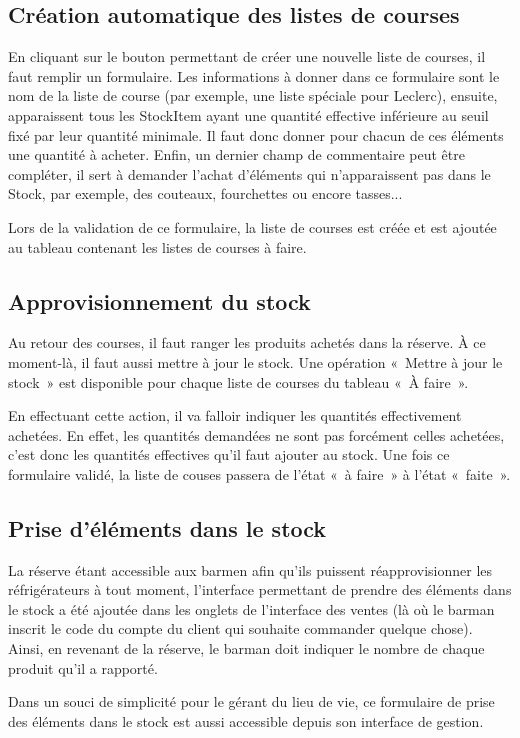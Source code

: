 \documentclass[a4paper]{report}
\begin{document}
\subsection{Création automatique des listes de courses}
\par En cliquant sur le bouton permettant de créer une nouvelle liste de courses, il faut remplir un formulaire. Les
informations à donner dans ce formulaire sont le nom de la liste de course (par exemple, une liste spéciale pour
Leclerc), ensuite, apparaissent tous les StockItem ayant une quantité effective inférieure au seuil fixé par leur
quantité minimale. Il faut donc donner pour chacun de ces éléments une quantité à acheter. Enfin, un dernier champ de
commentaire peut être compléter, il sert à demander l'achat d'éléments qui n'apparaissent pas dans le Stock, par
exemple, des couteaux, fourchettes ou encore tasses...
\par Lors de la validation de ce formulaire, la liste de courses est créée et est ajoutée au tableau contenant les
listes de courses à faire.

\subsection{Approvisionnement du stock}
\par Au retour des courses, il faut ranger les produits achetés dans la réserve. À ce moment-là, il faut aussi mettre à
jour le stock. Une opération « Mettre à jour le stock » est disponible pour chaque liste de courses du tableau « À
faire ».
\par En effectuant cette action, il va falloir indiquer les quantités effectivement achetées. En effet, les quantités
demandées ne sont pas forcément celles achetées, c'est donc les quantités effectives qu'il faut ajouter au stock. Une
fois ce formulaire validé, la liste de couses passera de l'état « à faire » à l'état « faite ».

\subsection{Prise d'éléments dans le stock}
\par La réserve étant accessible aux barmen afin qu'ils puissent réapprovisionner les réfrigérateurs à tout moment,
l'interface permettant de prendre des éléments dans le stock a été ajoutée dans les onglets de l'interface des ventes
(là où le barman inscrit le code du compte du client qui souhaite commander quelque chose). Ainsi, en revenant de la
réserve, le barman doit indiquer le nombre de chaque produit qu'il a rapporté.
\par Dans un souci de simplicité pour le gérant du lieu de vie, ce formulaire de prise des éléments dans le stock est
aussi accessible depuis son interface de gestion.
\end{document}
